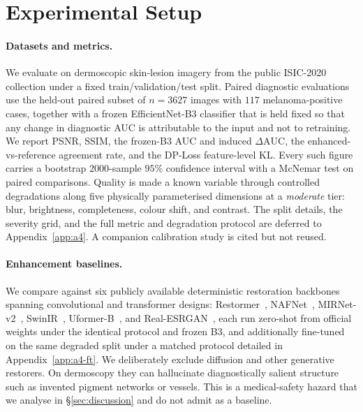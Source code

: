 
\section{Experimental Setup}
\label{sec:setup}

\paragraph{Datasets and metrics.}
We evaluate on dermoscopic skin-lesion imagery from the public ISIC-2020
collection under a fixed train/validation/test split. Paired diagnostic
evaluations use the held-out paired subset of $n=3627$ images with $117$
melanoma-positive cases, together with a frozen EfficientNet-B3 classifier that is
held fixed so that any change in diagnostic AUC is attributable to the input and not
to retraining. We report PSNR, SSIM, the frozen-B3 AUC and induced $\Delta\mathrm{AUC}$,
the enhanced-vs-reference agreement rate, and the DP-Loss feature-level KL. Every
such figure carries a bootstrap $2000$-sample $95\%$ confidence interval with a
McNemar test on paired comparisons. Quality is made a known variable through
controlled degradations along five physically parameterised dimensions at a
\emph{moderate} tier: blur, brightness, completeness, colour shift, and contrast. The
split details, the severity grid, and the full metric and degradation protocol are
deferred to Appendix~\ref{app:a4}. A companion calibration study is cited
\citep{ANON-BMVC} but not reused.

\paragraph{Enhancement baselines.}
We compare against six publicly available deterministic restoration backbones
spanning convolutional and transformer designs: Restormer~\citep{zamir2022restormer},
NAFNet~\citep{chen2022simple}, MIRNet-v2~\citep{zamir2022mirnetv2},
SwinIR~\citep{liang2021swinir}, Uformer-B~\citep{wang2022uformer}, and
Real-ESRGAN~\citep{wang2021realesrgan}, each run zero-shot from official weights
under the identical protocol and frozen B3, and additionally fine-tuned on the same
degraded split under a matched protocol detailed in Appendix~\ref{app:a4-ft}.
We deliberately exclude diffusion and other generative restorers. On dermoscopy they
can hallucinate diagnostically salient structure such as invented pigment networks or
vessels. This is a medical-safety hazard that we analyse in \S\ref{sec:discussion} and
do not admit as a baseline.

